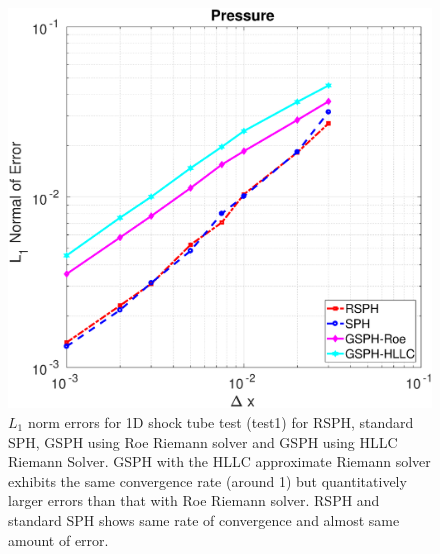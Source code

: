 \begin{figure}[H]
\begin{minipage}{.332 \textwidth}
    \end{minipage}%
    \begin{minipage}{.332\textwidth}
        \centering
        \includegraphics[width=0.99 \textwidth]{Chapter-4/Figures/Accuracy-pre}
    \end{minipage}%
    \caption{ $L_1$ norm errors for 1D shock tube test (test1) for RSPH, standard SPH, GSPH using Roe Riemann solver and GSPH using HLLC Riemann Solver.  GSPH with the HLLC approximate Riemann solver exhibits the same convergence rate (around 1) but quantitatively larger errors than that with Roe Riemann solver. RSPH and standard SPH shows same rate of convergence and almost same amount of error.}
    \label{fig:Accuracy-test1}
\end{figure}
 
